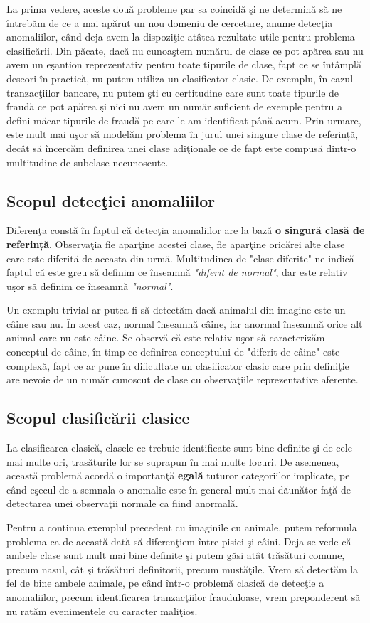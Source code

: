 La prima vedere, aceste două probleme par sa coincidă şi ne determină
să ne întrebăm de ce a mai apărut un nou domeniu de cercetare, anume detecţia
anomaliilor, când deja avem la dispoziţie atâtea rezultate utile pentru 
problema clasificării. Din păcate, dacă nu cunoaştem numărul de clase ce pot apărea 
sau nu avem un eşantion reprezentativ pentru toate tipurile de clase, fapt ce se 
întâmplă deseori în practică, nu putem utiliza un clasificator clasic. De exemplu, 
în cazul tranzacţiilor bancare, nu putem şti cu certitudine care sunt toate 
tipurile de fraudă ce pot apărea şi nici nu avem un număr suficient de exemple 
pentru a defini măcar tipurile de fraudă pe care le-am identificat până acum.
Prin urmare, este mult mai uşor să modelăm problema în jurul unei singure clase 
de referință, decât să încercăm definirea unei clase adiţionale ce de fapt 
este compusă dintr-o multitudine de subclase necunoscute.


\subsection{Scopul detecţiei anomaliilor}

Diferenţa constă în faptul că detecţia anomaliilor are la bază \textbf{o singură clasă
de referință}. Observaţia fie aparţine acestei clase, fie aparţine oricărei alte clase 
care este diferită de aceasta din urmă. Multitudinea de "clase diferite" ne indică
faptul că este greu să definim ce înseamnă \textit{"diferit de normal"}, dar este relativ uşor
să definim ce înseamnă \textit{"normal"}.

Un exemplu trivial ar putea fi să detectăm dacă animalul din imagine este un câine sau nu.
În acest caz, normal înseamnă câine, iar anormal înseamnă orice alt animal care nu este
câine. Se observă că este relativ uşor să caracterizăm conceptul de câine, în timp ce 
definirea conceptului de "diferit de câine" este complexă, fapt ce ar pune în dificultate
un clasificator clasic care prin definiţie are nevoie de un număr cunoscut de clase 
cu observaţiile reprezentative aferente.

\subsection{Scopul clasificării clasice}

La clasificarea clasică, clasele ce trebuie identificate sunt bine 
definite şi de cele mai multe ori, trasăturile lor se suprapun în mai multe locuri. De 
asemenea, această problemă acordă o importanţă \textbf{egală} tuturor categoriilor
implicate, pe când 
eşecul de a semnala o anomalie este în general mult mai dăunător faţă de 
detectarea unei observaţii normale ca fiind anormală. 

Pentru a continua exemplul precedent cu imaginile cu animale, putem reformula problema 
ca de această dată să diferenţiem între pisici şi câini. Deja se vede că ambele clase 
sunt mult mai bine definite şi putem găsi atât trăsături comune, precum nasul, cât şi 
trăsături definitorii, precum mustăţile. Vrem să detectăm la fel de bine ambele animale, 
pe când într-o problemă clasică de detecţie a anomaliilor, precum identificarea 
tranzacţiilor frauduloase, vrem preponderent să nu ratăm evenimentele cu 
caracter maliţios.
